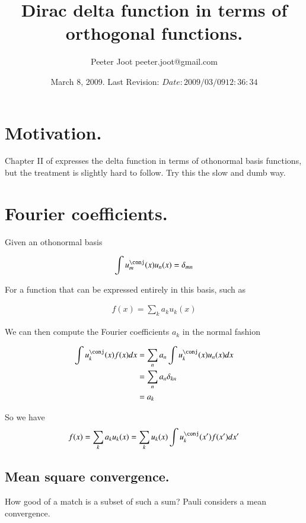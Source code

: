 \documentclass{article}
\title{ Dirac delta function in terms of orthogonal functions. }
\author{Peeter Joot \quad peeter.joot@gmail.com }
\date{ March 8, 2009.  Last Revision: $Date: 2009/03/09 12:36:34 $ }
\begin{document}
\maketitle{}

\section{ Motivation. }

Chapter II of \cite{pauli2000wm} expresses the delta function in terms of othonormal basis functions, but the treatment is slightly
hard to follow.  Try this the slow and dumb way.

\section{ Fourier coefficients. }

Given an othonormal basis 

\begin{align*}
\int u_m^\conj(x) u_n(x) = \delta_{mn}
\end{align*}

For a function that can be expressed entirely in this basis, such as

\begin{align*}
f(x) = \sum_k a_k u_k(x)
\end{align*}

We can then compute the Fourier coefficients $a_k$ in the normal fashion

\begin{align*}
\int u_k^\conj(x) f(x) dx 
&= \sum_n a_n \int u_k^\conj(x) u_n(x) dx \\
&= \sum_n a_n \delta_{kn} \\
&= a_k \\
\end{align*}

So we have 
\begin{align*}
f(x) = \sum_k a_k u_k(x)  = \sum_k u_k(x) \int u_k^\conj(x') f(x') dx'
\end{align*}

\subsection{ Mean square convergence. }

How good of a match is a subset of such a sum?  Pauli considers a mean convergence.
\end{document}
